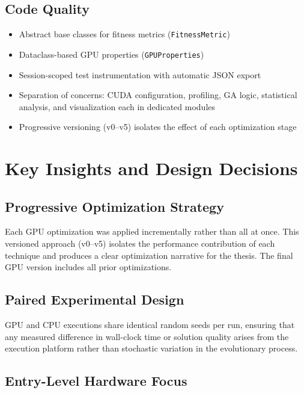 \documentclass[a4paper,14pt]{extarticle}
\begin{document}
\subsection{Code Quality}

\begin{itemize}
  \item Abstract base classes for fitness metrics (\texttt{FitnessMetric})
  \item Dataclass-based GPU properties (\texttt{GPUProperties})
  \item Session-scoped test instrumentation with automatic JSON export
  \item Separation of concerns: CUDA configuration, profiling, GA logic, statistical analysis,
        and visualization each in dedicated modules
  \item Progressive versioning (v0--v5) isolates the effect of each optimization stage
\end{itemize}


\section{Key Insights and Design Decisions}

\subsection{Progressive Optimization Strategy}

Each GPU optimization was applied incrementally rather than all at once. This versioned
approach (v0--v5) isolates the performance contribution of each technique and produces a clear
optimization narrative for the thesis. The final GPU version includes all prior optimizations.

\subsection{Paired Experimental Design}

GPU and CPU executions share identical random seeds per run, ensuring that any measured
difference in wall-clock time or solution quality arises from the execution platform rather
than stochastic variation in the evolutionary process.

\subsection{Entry-Level Hardware Focus}
\end{document}
